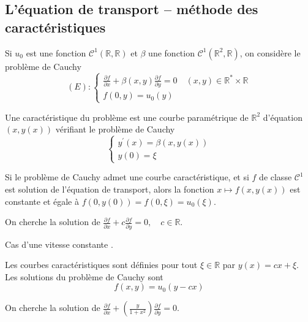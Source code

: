 \documentclass[12pt]{article}
\newcounter{theoreme}
\newcounter{exercice}
\newcounter{remarque}
\begin{document}
\subsection{L'équation de transport -- méthode des caractéristiques}

Si $u_{0}$ est une fonction $\mathcal{C}^{1}(\mathbb{R}, \mathbb{R})$ et $\beta$ une fonction $\mathcal{C}^{1}\left(\mathbb{R}^{2}, \mathbb{R}\right)$, on considère le problème de Cauchy
$$
(E):\left\{\begin{array}{l}
\frac{\partial f}{\partial x} + \beta(x, y) \frac{\partial f}{\partial y} = 0 \quad (x, y) \in \mathbb{R}^{*} \times \mathbb{R} \\
f(0, y) = u_{0}(y)
\end{array}\right.
$$

Une caractéristique du problème est une courbe paramétrique de $\mathbb{R}^{2}$ d'équation $(x, y(x))$ vérifiant le problème de Cauchy
$$
\left\{\begin{array}{l}
y^{\prime}(x) = \beta(x, y(x)) \\
y(0) = \xi
\end{array}\right.
$$

\begin{theoreme}[title=Théorème (admis)]
Si le problème de Cauchy admet une courbe caractéristique, et si $f$ de classe $\mathcal{C}^{1}$ est solution de l'équation de transport, alors la fonction $x \longmapsto f(x, y(x))$ est constante et égale à $f(0, y(0)) = f(0, \xi) = u_{0}(\xi)$.
\end{theoreme}

\begin{exercice}
On cherche la solution de $\frac{\partial f}{\partial x} + c \frac{\partial f}{\partial y} = 0, \quad c \in \mathbb{R}$.
\end{exercice}

\begin{remarque}
Cas d'une \og  vitesse constante \fg{} .
\end{remarque}

\begin{corrige}
Les courbes caractéristiques sont définies pour tout $\xi \in \mathbb{R}$ par $y(x) = cx + \xi$.\\
Les solutions du problème de Cauchy sont
$$
f(x, y) = u_{0}(y - cx)
$$
\end{corrige}

\begin{exercice}
On cherche la solution de $\frac{\partial f}{\partial x} + \left(\frac{y}{1+x^{2}}\right) \frac{\partial f}{\partial y} = 0$.
\end{exercice}
\end{document}
